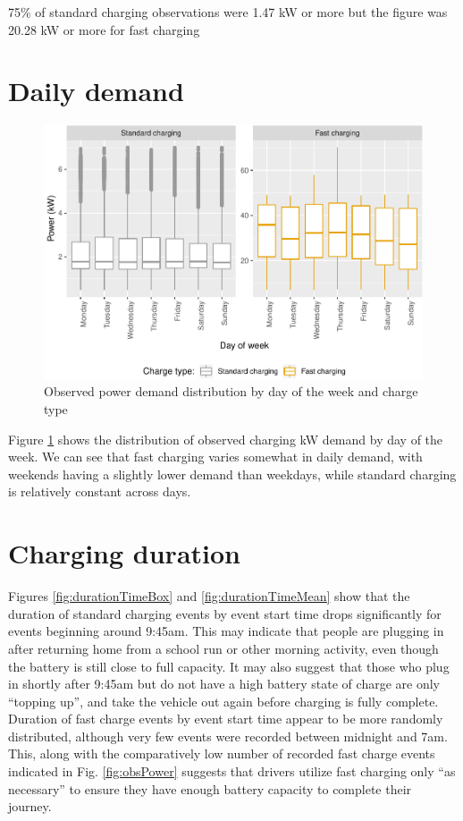 \documentclass[]{article}
\begin{document}
75\% of standard charging observations were 1.47 kW or more but the
figure was 20.28 kW or more for fast charging

\section{Daily demand}\label{dailyDemand}

\begin{figure}
\centering
\includegraphics{EVBB_report_files/figure-latex/dailyPower-1.pdf}
\caption{\label{fig:dailyPower}Observed power demand distribution by day of
the week and charge type}
\end{figure}

Figure \ref{fig:dailyPower} shows the distribution of observed charging
kW demand by day of the week. We can see that fast charging varies
somewhat in daily demand, with weekends having a slightly lower demand
than weekdays, while standard charging is relatively constant across
days.

\section{Charging duration}\label{duration}

Figures \ref{fig:durationTimeBox} and \ref{fig:durationTimeMean} show
that the duration of standard charging events by event start time drops
significantly for events beginning around 9:45am. This may indicate that
people are plugging in after returning home from a school run or other
morning activity, even though the battery is still close to full
capacity. It may also suggest that those who plug in shortly after
9:45am but do not have a high battery state of charge are only ``topping
up'', and take the vehicle out again before charging is fully complete.
Duration of fast charge events by event start time appear to be more
randomly distributed, although very few events were recorded between
midnight and 7am. This, along with the comparatively low number of
recorded fast charge events indicated in Fig. \ref{fig:obsPower}
suggests that drivers utilize fast charging only ``as necessary'' to
ensure they have enough battery capacity to complete their journey.
\end{document}
